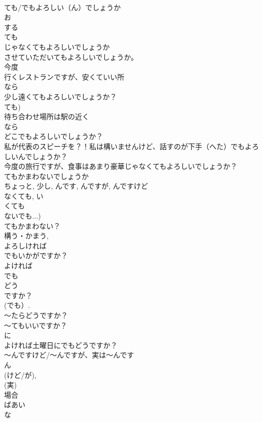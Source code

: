 \documentclass[8pt]{extreport}
\begin{document}
\begin{CJK}{UTF8}{min}
\\	ても/でもよろしい（ん）でしょうか
\\	お
\\	する
\\	ても 
\\	じゃなくてもよろしいでしょうか
\\	させていただいてもよろしいでしょうか。
\\	今度
\\	行くレストランですが、安くていい所
\\	なら
\\	少し遠くてもよろしいでしょうか？
\\	ても)
\\	待ち合わせ場所は駅の近く
\\	なら
\\	どこでもよろしいでしょうか？
\\	私が代表のスピーチを？！私は構いませんけど、話すのが下手（へた）でもよろしいんでしょうか？
\\	今度の旅行ですが、食事はあまり豪華じゃなくてもよろしいでしょうか？
\\	てもかまわないでしょうか
\\	ちょっと, 少し, んです, んですが, んですけど
\\	なくても, い
\\	くても 
\\	ないでも...)
\\	てもかまわない？ 
\\	構う・かまう, 
\\	よろしければ
\\	でもいかがですか？
\\	よければ
\\	でも
\\	どう
\\	ですか？　
\\	(でも）. 
\\	～たらどうですか？　
\\	～てもいいですか？ 
\\	に
\\	よければ土曜日にでもどうですか？
\\	～んですけど/～んですが、実は～んです
\\	ん
\\	(けど/が), 
\\	(実) 
\\	場合
\\	ばあい
\\	な

\end{CJK}
\end{document}
